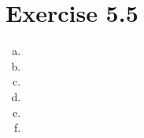 \documentclass{article} %
\newcommand{\homeworkNumber}{5}
\begin{document}
\section*{Exercise \homeworkNumber.5}

\begin{enumerate}[(a)]
	\item
	\item
	\item
	\item
	\item
	\item
\end{enumerate}
\end{document}
